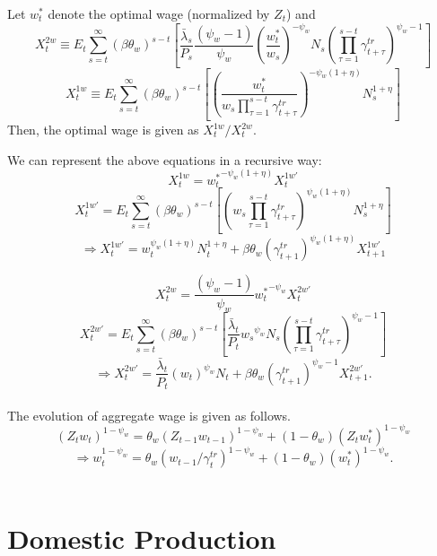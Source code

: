 \documentclass[11pt,titlepage]{article}
\begin{document}
Let $w_t^*$ denote the optimal wage (normalized by $Z_t$) and 
 \[X_{t}^{2w} \equiv E_t \sum_{s=t}^{\infty} (\beta \theta_w)^{s-t}
 \left[{\frac{\bar{\lambda}_{s}}{P_s}\frac{(\psi_w-1)}{\psi_w}\left(\frac{w_t^*}{w_{s}}\right)^{-\psi_w}N_s}{\left({\prod_{\tau=1}^{s-t} \gamma_{t+\tau}^{tr}}\right)^{\psi_w-1}} \right]\]
\[X_{t}^{1w} \equiv E_t \sum_{s=t}^{\infty} (\beta \theta_w)^{s-t}
\left[\left(\frac{w_t^*}{w_s{\prod_{\tau=1}^{s-t} \gamma_{t+\tau}^{tr}}} \right)^{-\psi_w (1+\eta)} N_s^{1+\eta}\right]\]
Then, the optimal wage is given as $X_t^{1w}/X_t^{2w}$.

We can represent the above equations in a recursive way:
\begin{equation} X_{t}^{1w} = {w_t^*}^{-\psi_w(1+\eta)}X_{t}^{1w'} \end{equation}
\[ X_{t}^{1w'} = E_t\sum_{s=t}^{\infty}(\beta\theta_w)^{s-t}
\left[\left({w_s{\prod_{\tau=1}^{s-t}\gamma_{t+\tau}^{tr}}} \right)^{\psi_w(1+\eta)} N_s^{1+\eta}\right]\]
\begin{equation} \Rightarrow X_{t}^{1w'} = w_t^{\psi_w(1+\eta)}N_t^{1+\eta} + \beta\theta_w (\gamma_{t+1}^{tr})^{\psi_w(1+\eta)} X_{t+1}^{1w'}\end{equation}

\begin{equation} X_{t}^{2w} =\frac{(\psi_w-1)}{\psi_w}{w_t^*}^{-\psi_w} X_{t}^{2w'} \end{equation}
\[X_{t}^{2w'} = E_t\sum_{s=t}^{\infty} (\beta \theta_w)^{s-t}
\left[{\frac{{\bar{\lambda}_{t}}}{P_t} {w_{s}}^{\psi_w} N_s} { \left({\prod_{\tau=1}^{s-t} \gamma_{t+\tau}^{tr}}\right)^{\psi_w-1}} \right ]\]
 \begin{equation} \Rightarrow X_{t}^{2w'} = {\frac{{\bar{\lambda}_{t}}}{P_t}\left({w_{t}} \right)^{\psi_w} N_t} 
+ \beta\theta_w {\left({\gamma_{t+1}^{tr}}\right)^{\psi_w-1}} X_{t+1}^{2w'}. \end{equation}\\


The evolution of aggregate wage is given as follows.
\[(Z_t w_t)^{1-\psi_w} = \theta_w (Z_{t-1}w_{t-1})^{1-\psi_w} + (1-\theta_w)(Z_t w_{t}^*)^{1-\psi_w} \]
\[\Rightarrow w_t^{1-\psi_w} = \theta_w(w_{t-1}/\gamma_{t}^{tr})^{1-\psi_w} + (1-\theta_w)({w_{t}^*})^{1-\psi_w}.\]\\


\section{Domestic Production}
\end{document}
